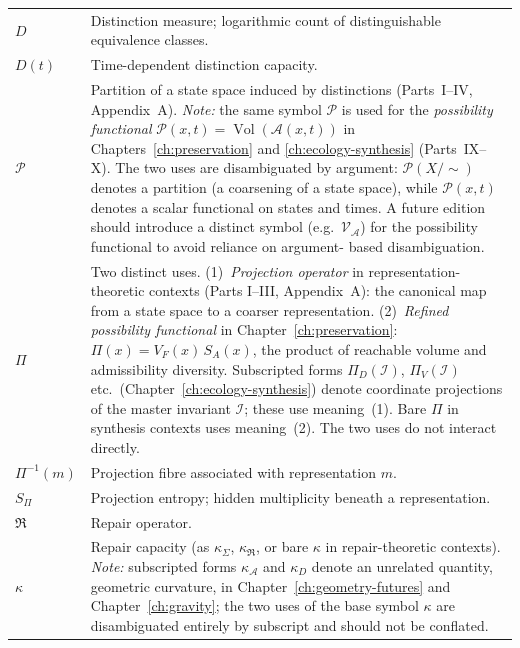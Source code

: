 \documentclass[12pt,twoside,openright]{book}
\newcommand{\partition}{\mathcal{P}}
\newcommand{\adm}{\mathcal{A}}
\newcommand{\repair}{\mathfrak{R}}
\newcommand{\Vol}{\operatorname{Vol}}
\begin{document}
\begin{center}
\begin{longtable}{p{3cm}p{10cm}}
$D$
&
Distinction measure; logarithmic count of
distinguishable equivalence classes.
\\

$D(t)$
&
Time-dependent distinction capacity.
\\

$\partition$
&
Partition of a state space induced by distinctions
(Parts~I--IV, Appendix~A). \emph{Note:} the same
symbol $\mathcal{P}$ is used for the \emph{possibility
functional} $\mathcal{P}(x,t) = \Vol(\adm(x,t))$ in
Chapters~\ref{ch:preservation} and
\ref{ch:ecology-synthesis} (Parts~IX--X). The two uses
are disambiguated by argument: $\mathcal{P}(X/{\sim})$
denotes a partition (a coarsening of a state space),
while $\mathcal{P}(x,t)$ denotes a scalar functional
on states and times. A future edition should introduce
a distinct symbol (e.g.\ $\mathcal{V}_\adm$) for the
possibility functional to avoid reliance on argument-
based disambiguation.
\\

$\Pi$
&
Two distinct uses. (1)~\emph{Projection operator} in
representation-theoretic contexts (Parts I--III,
Appendix~A): the canonical map from a state space to
a coarser representation. (2)~\emph{Refined possibility
functional} in Chapter~\ref{ch:preservation}:
$\Pi(x) = V_F(x)\,S_A(x)$, the product of reachable
volume and admissibility diversity. Subscripted forms
$\Pi_D(\mathcal{I})$, $\Pi_V(\mathcal{I})$ etc.\
(Chapter~\ref{ch:ecology-synthesis}) denote coordinate
projections of the master invariant $\mathcal{I}$; these
use meaning~(1). Bare $\Pi$ in synthesis contexts uses
meaning~(2). The two uses do not interact directly.
\\

$\Pi^{-1}(m)$
&
Projection fibre associated with representation $m$.
\\

$S_\Pi$
&
Projection entropy; hidden multiplicity beneath a
representation.
\\

$\repair$
&
Repair operator.
\\

$\kappa$
&
Repair capacity (as $\kappa_\Sigma$, $\kappa_\repair$, or bare
$\kappa$ in repair-theoretic contexts). \emph{Note:} subscripted
forms $\kappa_\adm$ and $\kappa_D$ denote an unrelated quantity,
geometric curvature, in Chapter~\ref{ch:geometry-futures} and
Chapter~\ref{ch:gravity}; the two uses of the base symbol
$\kappa$ are disambiguated entirely by subscript and should not
be conflated.
\\


\end{longtable}
\end{center}
\end{document}
